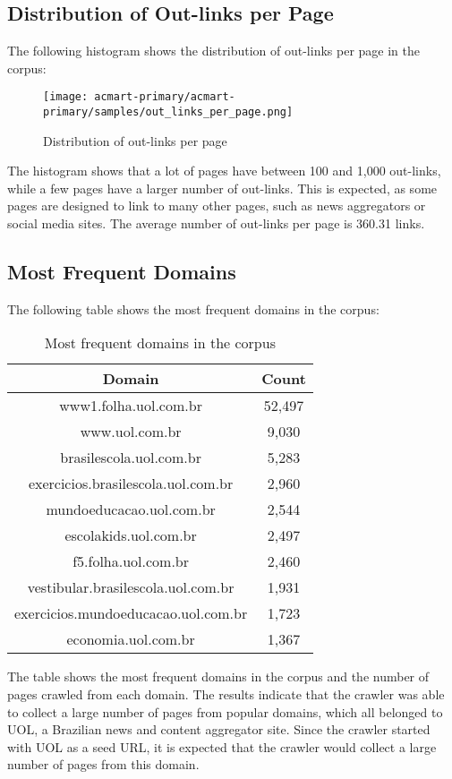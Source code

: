 \documentclass[sigconf]{acmart}
\begin{document}
\subsection{Distribution of Out-links per Page}
The following histogram shows the distribution of out-links per page in the corpus:
\begin{figure}[H]
\centering
\texttt{[image: acmart-primary/acmart-primary/samples/out\_links\_per\_page.png]}
\caption{Distribution of out-links per page}
\label{fig:histogram_links}
\end{figure}
The histogram shows that a lot of pages have between 100 and 1,000 out-links, while a few pages have a larger number of out-links. This is expected, as some pages are designed to link to many other pages, such as news aggregators or social media sites. The average number of out-links per page is 360.31 links.

\subsection{Most Frequent Domains}
The following table shows the most frequent domains in the corpus:
\begin{table}[H]
\centering
\begin{tabular}{|c|c|}
\hline
\textbf{Domain} & \textbf{Count} \\ \hline
www1.folha.uol.com.br & 52,497 \\ \hline
www.uol.com.br & 9,030 \\ \hline
brasilescola.uol.com.br & 5,283 \\ \hline
exercicios.brasilescola.uol.com.br & 2,960 \\ \hline
mundoeducacao.uol.com.br & 2,544 \\ \hline
escolakids.uol.com.br & 2,497 \\ \hline
f5.folha.uol.com.br & 2,460 \\ \hline
vestibular.brasilescola.uol.com.br & 1,931 \\ \hline
exercicios.mundoeducacao.uol.com.br & 1,723 \\ \hline
economia.uol.com.br & 1,367 \\ \hline
\end{tabular}
\caption{Most frequent domains in the corpus}
\label{tab:domains}
\end{table}

The table shows the most frequent domains in the corpus and the number of pages crawled from each domain. The results indicate that the crawler was able to collect a large number of pages from popular domains, which all belonged to UOL, a Brazilian news and content aggregator site. Since the crawler started with UOL as a seed URL, it is expected that the crawler would collect a large number of pages from this domain.
\end{document}
